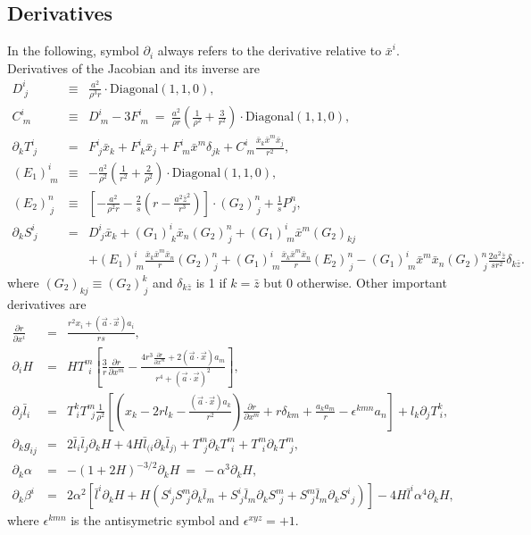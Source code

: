 \documentclass{article}
\begin{document}
\subsection{Derivatives}
In the following, symbol $\partial_i$ always refers to the derivative relative to $\bar{x}^i$. Derivatives of the Jacobian and its inverse are
\begin{eqnarray}
	D^i_{\ j} &\equiv& \frac{a^2}{\rho^3 r}\cdot\mbox{Diagonal}(1,1,0), \\
	C^i_{\ m} &\equiv& D^i_{\ m}-3F^i_{\ m} \ =\  \frac{a^2}{\rho r} \left(\frac{1}{\rho^2}+\frac{3}{r^2}\right) \cdot\mbox{Diagonal}(1,1,0), \\
	\partial_{k}T^i_{\ j} &=& F^i_{\ j}\bar{x}_k+ F^i_{\ k}\bar{x}_j+ F^i_{\ m}\bar{x}^m \delta_{jk}+ C^i_{\ m} \frac{\bar{x}_k\bar{x}^m\bar{x}_j}{r^2}, \\
	(E_1)^i_{\ m} &\equiv& -\frac{a^2}{\rho^2} \left(\frac{1}{r^2}+\frac{2}{\rho^2}\right) \cdot\mbox{Diagonal}(1,1,0), \\
	(E_2)^n_{\ j} &\equiv& \left[-\frac{a^2}{\rho^2 r}-\frac{2}{s}\left(r -\frac{a^2\bar{z}^2}{r^3}\right)\right] \cdot(G_2)^n_{\ j} + \frac{1}{s}P^n_{\ j}, \\
	\partial_{k}S^i_{\ j} &=& D^i_{\ j}\bar{x}_k +(G_1)^i_{\ k}\bar{x}_n(G_2)^n_{\ j} +(G_1)^i_{\ m}\bar{x}^m(G_2)_{kj} 
	\nonumber \\
	&&+(E_1)^i_{\ m} \frac{\bar{x}_k\bar{x}^m\bar{x}_n}{r} (G_2)^n_{\ j} +(G_1)^i_{\ m} \frac{\bar{x}_k\bar{x}^m\bar{x}_n}{r} (E_2)^n_{\ j} -(G_1)^i_{\ m}\bar{x}^m\bar{x}_n(G_2)^n_{\ j}\frac{2a^2\bar{z}}{sr^2}\delta_{k\bar{z}}.
\end{eqnarray}
where $(G_2)_{kj} \equiv (G_2)^k_{\ j}$ and $\delta_{k\bar{z}}$ is 1 if $k=\bar{z}$ but 0 otherwise. Other important derivatives are
\begin{eqnarray}
	\frac{\partial r}{\partial x^i} &=& \frac{r^2 x_i + (\vec{a}\cdot\vec{x}) a_i}{ 
	rs},\\
	\partial_{i} H &=& 
	HT^m_{\ \ i}\left[\frac{3}{r}\frac{\partial r}{\partial x^m} - \frac{4 r^3 \displaystyle\frac{\partial r}{\partial x^m} + 2(\vec{a}\cdot\vec{x})a_m}{r^4 + (\vec{a}\cdot\vec{x})^2}\right] , \\
	\partial_{j} \bar{l}_i &=& T^k_{\ i} T^m_{\ \ j} \frac{1}{\rho^2} \left[ \left(x_k-2 r l_k-\frac{(\vec{a}\cdot\vec{x})a_k}{r^2}\right) \frac{\partial r}{\partial x^m}
	+ r\delta_{km} + \frac{a_k a_m}{r} - \epsilon^{kmn} a_n \right]  +l_k \partial_{j}T^k_{\ i}, \\
	\partial_{k}g_{i j} &=& 2 \bar{l}_i \bar{l}_j\partial_{k} H + 4 H \bar{l}_{(i} \partial_{k}\bar{l}_{j)} +T^m_{\ \ j}\partial_{k} T^m_{\ \ i} +T^m_{\ \ i}\partial_{k} T^m_{\ \ j}, \\
	\partial_{k}\alpha &=& -(1+2 H)^{-3/2}\partial_{k}H \ = \ -\alpha^3\partial_{k}H,\\
	\partial_{k}\beta^i &=& 2\alpha^2
	\left[\bar{l}^i\partial_{k}H+H(S^i_{\ j}S^m_{\ \ j}\partial_{k}\bar{l}_m +S^i_{\ j}\bar{l}_m\partial_{k}S^m_{\ \ j}+S^m_{\ \ j}\bar{l}_m\partial_{k}S^i_{\ \ j})\right]
	- 4 H \bar{l}^i \alpha^4\partial_{k}H,
\end{eqnarray}
where $\epsilon^{kmn}$ is the antisymetric symbol and $\epsilon^{xyz}=+1$. 
\end{document}
